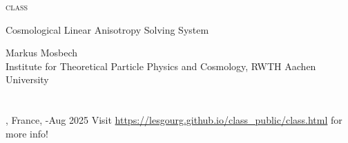 
\begin{frame}

\begin{block}{
\begin{center}\Large \scshape class\end{center}}
\begin{center}\small Cosmological Linear Anisotropy Solving System \end{center}
\end{block}

\scriptsize

\begin{center}
	Markus Mosbech\\
	Institute for Theoretical Particle Physics and Cosmology, RWTH Aachen University\\
	\mbox{}\\
	\mbox{}\\
	\location, France, \ecolefromdate-\ecoletodate Aug 2025
	\vfill
	Visit \url{https://lesgourg.github.io/class_public/class.html} for more info!
\end{center}

\end{frame}
